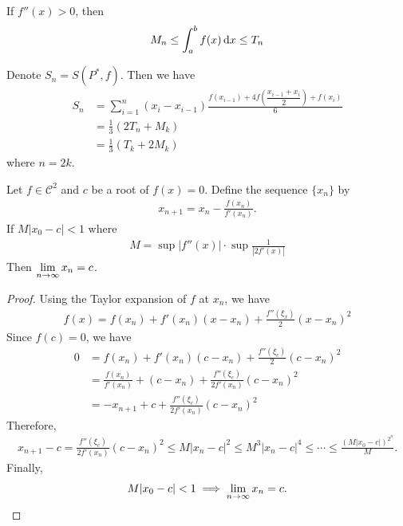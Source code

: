 \begin{corollary}
    If $f''(x)>0$, then
    \begin{align*}
        M_n \le \int_{a}^{b} f(x) \operatorname*{d\!} x \le T_n
    \end{align*}
\end{corollary}

\begin{example} 
    Denote $S_n = S(P^*, f)$. Then we have
    \begin{align*}
        S_n &= \sum_{i=1}^{n} (x_i - x_{i-1})\frac{f(x_{i-1}) + 4f\left(\dfrac{x_{i-1}+x_i}{2}\right) + f(x_i)}{6} \\
        &= \frac{1}{3}(2T_n + M_{k}) \\
        &= \frac{1}{3}(T_k + 2M_k)
    \end{align*}
    where $n = 2k$.
\end{example}

\begin{theorem} 
    Let $f\in \mathcal{C}^2$ and $c$ be a root of $f(x)=0$. Define the sequence $\{x_n\}$ by
    \begin{align*}
        x_{n+1} = x_n - \frac{f(x_n)}{f'(x_n)}.
    \end{align*}
    If $M|x_0-c| < 1$ where
    \begin{align*}
        M = \sup |f''(x)|\cdot \sup \frac{1}{|2f'(x)|}
    \end{align*}
    Then $\lim\limits_{n\to\infty} x_n = c$.
\end{theorem}
\begin{proof}
    Using the Taylor expansion of $f$ at $x_n$, we have
    \begin{align*}
        f(x) = f(x_n) + f'(x_n)(x-x_n) + \frac{f''(\xi_x)}{2}(x-x_n)^2
    \end{align*}
    Since $f(c)=0$, we have
    \begin{align*}
        0 &= f(x_n) + f'(x_n)(c-x_n) + \frac{f''(\xi_c)}{2}(c-x_n)^2 \\
        &= \frac{f(x_n)}{f'(x_n)} + (c-x_n) + \frac{f''(\xi_c)}{2f'(x_n)}(c-x_n)^2 \\
        &= - x_{n+1} + c + \frac{f''(\xi_c)}{2f'(x_n)}(c-x_n)^2
    \end{align*}
    Therefore,
    \begin{align*}
        x_{n+1} - c = \frac{f''(\xi_c)}{2f'(x_n)}(c-x_n)^2 \le M|x_n - c|^2 \le M^3|x_n - c|^4 \le \cdots \le \frac{(M|x_0 - c|)^{2^n}}{M}.
    \end{align*}
    Finally,
    \begin{align*}
        M|x_0 - c| < 1 \implies \lim\limits_{n\to\infty} x_n = c.
    \end{align*}
\end{proof}
